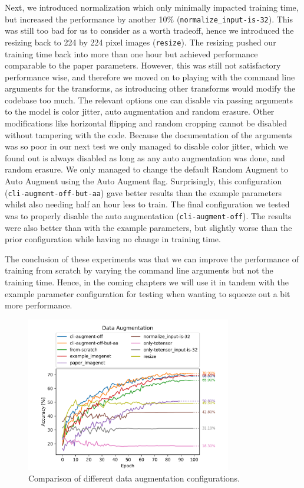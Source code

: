 \documentclass{article}
\begin{document}
Next, we introduced normalization which only minimally impacted training time, but increased the performance by another 10\% (\texttt{normalize\_input-is-32}).
This was still too bad for us to consider as a worth tradeoff, hence we introduced the resizing back to 224 by 224 pixel images (\texttt{resize}).
The resizing pushed our training time back into more than one hour but achieved performance comparable to the paper parameters.
However, this was still not satisfactory performance wise, and therefore we moved on to playing with the command line arguments for the transforms, as introducing other transforms would modify the codebase too much.
The relevant options one can disable via passing arguments to the model is color jitter, auto augmentation and random erasure.
Other modifications like horizontal flipping and random cropping cannot be disabled without tampering with the code.
Because the documentation of the arguments was so poor in our next test we only managed to disable color jitter, which we found out is always disabled as long as any auto augmentation was done, and random erasure.
We only managed to change the default Random Augment to Auto Augment using the Auto Augment flag.
Surprisingly, this configuration (\texttt{cli-augment-off-but-aa}) gave better results than the example parameters whilst also needing half an hour less to train.
The final configuration we tested was to properly disable the auto augmentation (\texttt{cli-augment-off}).
The results were also better than with the example parameters, but slightly worse than the prior configuration while having no change in training time.

The conclusion of these experiments was that we can improve the performance of training from scratch by varying the command line arguments but not the training time.
Hence, in the coming chapters we will use it in tandem with the example parameter configuration for testing when wanting to squeeze out a bit more performance.
\begin{figure}[h]
    \centering
    \includegraphics[width=0.8\textwidth]{images/data_augmentation}
    \caption{Comparison of different data augmentation configurations.}
    \label{fig:data-augmentation}
\end{figure}
\end{document}
